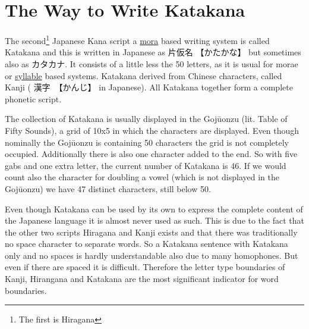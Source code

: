 \chapter{The Way to Write Katakana}
\label{chap:TheWayToWriteKatakana}
\label{sec:TheWayToWriteKatakana}  %
\label{sec:Gojuonzu}               %

The second\footnote{The first is Hiragana} Japanese Kana script a
\hyperref[sec:Mora]{mora}  based writing system is called Katakana and this is
written in Japanese as {片仮名} {【かたかな】} but sometimes also as
{カタカナ}.  It consists of a little less the 50 letters, as it is usual for
morae or \hyperref[sec:Syllable]{syllable} based systems. Katakana derived from
Chinese characters, called Kanji ( {漢字}　{【かんじ】} in Japanese). All
Katakana together form a complete phonetic script.

The collection of Katakana is usually displayed in the Gojūonzu (lit. Table of
Fifty Sounds), a grid of 10x5 in which the characters are displayed. Even
though nominally the Gojūonzu is containing 50 characters the grid is not
completely occupied. Additionally there is also one character added to the
end. So with five gabs and one extra letter, the current number of Katakana is
46. If we would count also the character for doubling a vowel (which is not
displayed in the Gojūonzu) we have 47 distinct characters, still below 50. 



Even though Katakana can be used by its own to express the complete content of
the Japanese language it is almost never used as such. This is due to the fact
that the other two scripts Hiragana and Kanji exists and that there was
traditionally no space character to separate words. So a Katakana sentence with
Katakana only and no spaces is hardly understandable also due to many
homophones.  But even if there are spaced it is difficult. Therefore the letter
type boundaries of Kanji, Hirangana and Katakana are the most significant
indicator for word boundaries.

